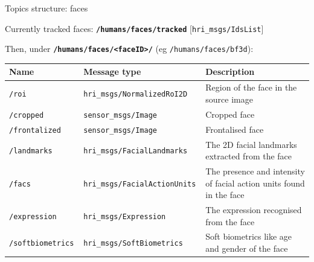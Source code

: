 \documentclass[xcolor=table,aspectratio=169]{beamer}
\begin{document}
\begin{frame}{Topics structure: faces}

    Currently tracked faces: \textbf{\texttt{/humans/faces/tracked}}
    [\texttt{hri\_msgs/IdsList}]

    \vspace{1em}

    \pause

    Then, under \textbf{\texttt{/humans/faces/<faceID>/}} (eg \texttt{/humans/faces/bf3d}):

    \scriptsize
    \begin{tabular}{@{}p{2.5cm}p{4.5cm}p{6cm}@{}}
        \toprule
\textbf{Name} & \textbf{Message type}         & \textbf{Description}                                                \\ \midrule
        \texttt{/roi       }   & \texttt{hri\_msgs/NormalizedRoI2D} & Region of the face in the source image                              \\
        \texttt{/cropped       }   & \texttt{sensor\_msgs/Image} & Cropped face                              \\
        \texttt{/frontalized       }   & \texttt{sensor\_msgs/Image} & Frontalised face                              \\
        \texttt{/landmarks }   & \texttt{hri\_msgs/FacialLandmarks    } & The 2D facial landmarks extracted from the face                     \\
        \texttt{/facs      }   & \texttt{hri\_msgs/FacialActionUnits  } & The presence and intensity of facial action units found in the face \\
        \texttt{/expression}   & \texttt{hri\_msgs/Expression         } & The expression recognised from the face           \\
        \texttt{/softbiometrics      } & \texttt{hri\_msgs/SoftBiometrics }  &   Soft biometrics like age and gender of the face                                       \\  \bottomrule               
\end{tabular}
    
\end{frame}
\end{document}
